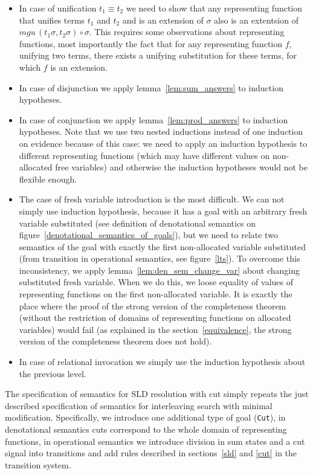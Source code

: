 \begin{itemize}
\item In case of unification $t_1\equiv t_2$ we need to show that any representing function that unifies terms $t_1$ and $t_2$ and is an extension of $\sigma$ also is an extentsion of $mgu\,(t_1 \sigma, t_2 \sigma) \circ \sigma$. This requires some observations about representing functions, most importantly the fact that for any representing function $f$, unifying two terms, there exists a unifying substitution for these terms, for which $f$ is an extension.
\item In case of disjunction we apply lemma~\ref{lem:sum_answers} to induction hypotheses.
\item In case of conjunction we apply lemma~\ref{lem:prod_answers} to induction hypotheses. Note that we use two nested inductions instead of one induction on evidence because of this case: we need to apply an induction hypothesis to different representing functions (which may have different values on non-allocated free variables) and otherwise the induction hypotheses would not be flexible enough.
\item The case of fresh variable introduction is the most difficult. We can not simply use induction hypothesis, because it has a goal with an arbitrary fresh variable substituted (see definition of denotational semantics on figure~\ref{denotational_semantics_of_goals}), but we need to relate two semantics of the goal with exactly the first non-allocated variable substituted (from transition in operational semantics, see figure~\ref{lts}). To overcome this inconsistency, we apply lemma~\ref{lem:den_sem_change_var} about changing substituted fresh variable. When we do this, we loose equality of values of representing functions on the first non-allocated variable. It is exactly the place where the proof of the strong version of the completeness theorem (without the restriction of domains of representing functions on allocated variables) would fail (as explained in the section~\ref{equivalence}, the strong version of the completeness theorem does not hold).
\item In case of relational invocation we simply use the induction hypothesis about the previous level.
\end{itemize}

The specification of semantics for SLD resolution with cut simply repeats the just described specification of semantics for interleaving search with minimal modification. Specifically, we introduce one additional type of goal (\lstinline|Cut|), in denotational semantics cuts correspond to the whole domain of representing functions, in operational semantics we introduce division in sum states and a cut signal into transitions and add rules described in sections~\ref{sld} and \ref{cut} in the transition system. 

